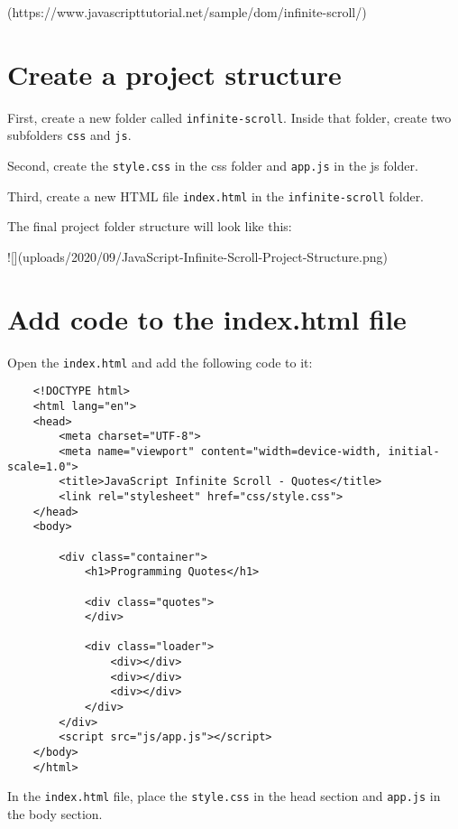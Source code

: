 \documentclass[11pt]{article}
\begin{document}
(https://www.javascripttutorial.net/sample/dom/infinite-scroll/)

\section*{Create a project structure}

First, create a new folder called \verb|infinite-scroll|. Inside that folder,
create two subfolders \verb|css| and \verb|js|.
\newline

\noindent
Second, create the \verb|style.css| in the css folder and \verb|app.js| in the js folder.
\newline

\noindent
Third, create a new HTML file \verb|index.html| in the \verb|infinite-scroll| folder.
\newline

\noindent
The final project folder structure will look like this:

![](uploads/2020/09/JavaScript-Infinite-Scroll-Project-Structure.png)

\section*{Add code to the index.html file}

Open the \verb|index.html| and add the following code to it:

\begin{lstlisting}
    <!DOCTYPE html>
    <html lang="en">
    <head>
        <meta charset="UTF-8">
        <meta name="viewport" content="width=device-width, initial-scale=1.0">
        <title>JavaScript Infinite Scroll - Quotes</title>
        <link rel="stylesheet" href="css/style.css">
    </head>
    <body>

        <div class="container">
            <h1>Programming Quotes</h1>

            <div class="quotes">
            </div>

            <div class="loader">
                <div></div>
                <div></div>
                <div></div>
            </div>
        </div>
        <script src="js/app.js"></script>
    </body>
    </html>
\end{lstlisting}

\noindent
In the \verb|index.html| file, place the \verb|style.css| in the head section
and \verb|app.js| in the body section.
\newline
\end{document}

